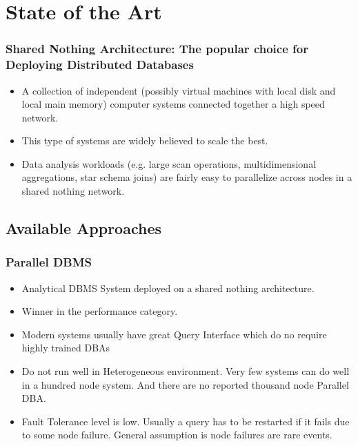 \documentclass{beamer}
\begin{document}
\section{State of the Art}
\label{sec:state-of-the-art}

\begin{frame}
  \frametitle{Shared Nothing Architecture: The popular choice for
    Deploying Distributed Databases}
  \begin{itemize}
  \item A collection of independent (possibly virtual machines with local disk and local main memory) computer systems connected together a high speed network.
  \item This type of systems are widely believed to scale the best.
  \item Data analysis workloads (e.g. large scan operations, multidimensional aggregations, star schema joins) are fairly easy to parallelize across nodes  in a shared nothing network.
  \end{itemize}
\end{frame}

\subsection{Available Approaches}

\begin{frame}
  \frametitle{Parallel DBMS}
  \begin{itemize}
  \item Analytical DBMS System deployed on a shared nothing
    architecture.
  \item Winner in the performance category.
  \item Modern systems usually have great Query Interface which do no require highly trained DBAs
  \item Do not run well in Heterogeneous environment. Very few systems
    can do well in a hundred node system. And there are no reported
    thousand node Parallel DBA.
  \item Fault Tolerance level is low. Usually a query has to be restarted if it fails due to some node failure. General assumption is node failures are rare events.
  \end{itemize}
\end{frame}
\end{document}
